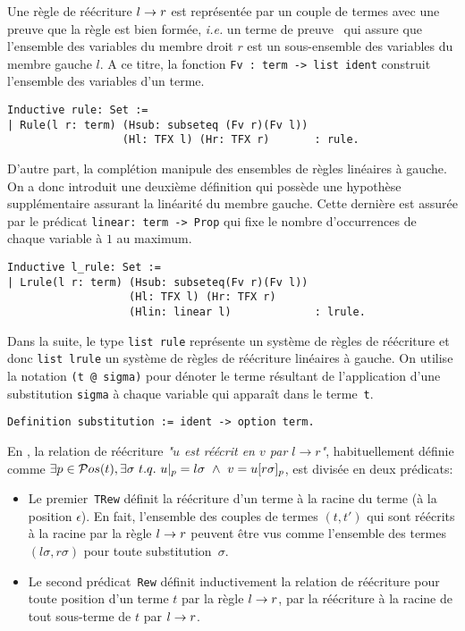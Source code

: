 Une règle de réécriture $l \rightarrow r$ est représentée par un couple de termes avec une preuve
que la règle est bien formée, \textit{i.e.} un terme de preuve \coq\ qui assure que l'ensemble des variables du membre droit $r$
est un sous-ensemble des variables du membre gauche $l$.
A ce titre, la fonction \lstinline!Fv : term -> list ident! construit l'ensemble des variables d'un terme. 
\begin{lstlisting}
Inductive rule: Set :=
| Rule(l r: term) (Hsub: subseteq (Fv r)(Fv l))
                  (Hl: TFX l) (Hr: TFX r)       : rule.
\end{lstlisting}
D'autre part, la complétion manipule des ensembles de règles linéaires à gauche. On a donc introduit une deuxième définition
qui possède une hypothèse supplémentaire assurant la linéarité du membre gauche. Cette dernière  est assurée par le prédicat
\lstinline!linear: term -> Prop! qui fixe le nombre d'occurrences de chaque variable à $1$ au maximum.
\begin{lstlisting}
Inductive l_rule: Set :=
| Lrule(l r: term) (Hsub: subseteq(Fv r)(Fv l))
                   (Hl: TFX l) (Hr: TFX r)
                   (Hlin: linear l)             : lrule.
\end{lstlisting}

Dans la suite, le type \lstinline!list rule! représente un système de règles de réécriture et donc
\lstinline!list lrule! un système de règles de réécriture linéaires à gauche.
On utilise la notation \lstinline!(t @ sigma)! pour dénoter le terme résultant de 
l'application d'une substitution \lstinline!sigma! à chaque variable qui apparaît dans le terme~\lstinline!t!. 

\begin{lstlisting}
Definition substitution := ident -> option term.
\end{lstlisting}

\noindent
En \coq, la relation de réécriture \emph{"$u$ est réécrit en $v$ par $l
  \rightarrow r$"}, habituellement définie comme $\exists p \in \mathcal{ P}os(t),\exists \sigma \
t.q.\ u|_p = l\sigma \ \land \ v = u [ r\sigma ]_p$, est divisée en deux prédicats:

\begin{itemize}
\item Le premier~\lstinline!TRew! définit la réécriture d'un terme à la racine du terme (à la position $\epsilon$). En
  fait, l'ensemble des couples de termes $(t, t')$ qui sont réécrits à la racine par la règle $l \rightarrow r$
  peuvent être vus comme l'ensemble des termes $(l\sigma, r\sigma)$ pour toute substitution~$\sigma$.

\item 
  Le second prédicat~\lstinline!Rew! définit inductivement la relation de réécriture pour toute position d'un terme $t$
  par la règle $l \rightarrow r$, par la réécriture à la racine de tout sous-terme de $t$ par $l \rightarrow r$.
\end{itemize}


